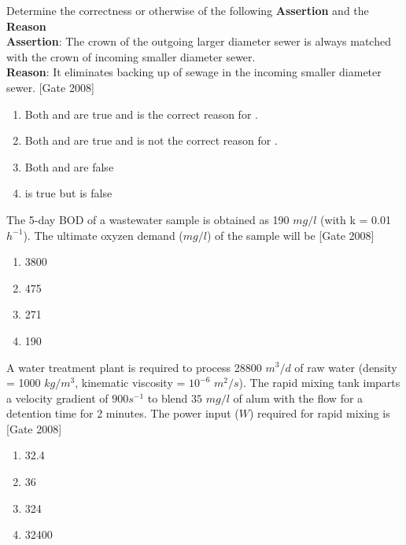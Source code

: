 	\item Determine the correctness or otherwise of the following \textbf{Assertion } and the \textbf{Reason }\\
\textbf{Assertion}: The crown of the outgoing larger diameter sewer is always matched with the crown of incoming smaller diameter sewer.\\
\textbf{Reason}: It eliminates backing up of sewage in the incoming smaller diameter sewer.  \hfill [Gate 2008]
	\begin{multicols}{2}
	\begin{enumerate}
		\item Both  and  are true and  is the correct reason for .
		\item Both  and  are true and  is not the correct reason for .

		\item Both  and  are false
		\item  {} is true but  is false

	\end{enumerate}
\end{multicols}
	\item The 5-day BOD of a wastewater sample is obtained as 190 $mg/l$ (with k = 0.01 $h^{-1}$). The ultimate oxyzen demand ($mg/l$) of the sample will be  \hfill [Gate 2008]
	\begin{multicols}{4}
	\begin{enumerate}
		\item 3800
		\item 475
		\item 271
		\item 190
	\end{enumerate}
\end{multicols}
\item A water treatment plant is required to process 28800 $m^3/d$ of raw water (density = 1000 $kg/m^3$, kinematic viscosity = $10^{-6}$ $m^2/s$). The rapid mixing tank imparts a velocity gradient of $900 s^{-1}$ to blend  $35$ $mg/l$ of alum with the flow for a detention time for 2 minutes. The power input ($W$) required for rapid mixing is  \hfill [Gate 2008]
\begin{multicols}{4}
	\begin{enumerate}
		\item 32.4
		\item 36
		\item 324
		\item 32400
	\end{enumerate}
\end{multicols}
